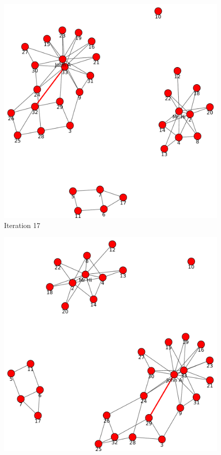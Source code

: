 \begin{itemize}
\begin{figure}[h!]
\begin{center}
\includegraphics[scale=0.55, keepaspectratio=true]{figures/graphs/EdgeHighlightedGraph17.pdf}
\caption{Iteration 17}
\label{fig:q2fig8}
\end{center}
\end{figure}
\newpage
\begin{figure}[h!]
\begin{center}
\includegraphics[scale=0.55, keepaspectratio=true]{figures/graphs/EdgeHighlightedGraph18.pdf}

\end{center}
\end{figure}
\end{itemize}
